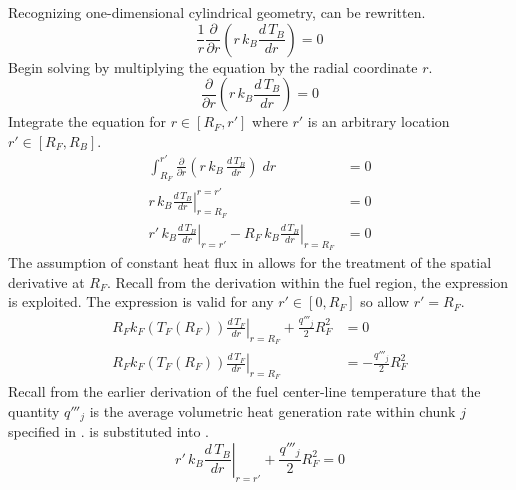       Recognizing one-dimensional cylindrical geometry,  can 
      be rewritten.
      \begin{equation}
        \label{eq:tb_heat_conduction}
        \frac{1}{r} \frac{\partial}{\partial r} \left(
          r \, k_B \frac{d \, T_B}{dr} \right) = 0
      \end{equation}
      Begin solving  by multiplying the equation by
      the radial coordinate $r$.
      \begin{equation}
        \frac{\partial}{\partial r} \left( r \, k_B \frac{d \, T_B}{dr}
          \right) = 0
      \end{equation}
      Integrate the equation for $r \in[R_F,r']$ where $r'$ is an arbitrary
      location $r' \in [R_F,R_B]$.
      \begin{align}
        \int_{R_F}^{r'} \frac{\partial}{\partial r} \left( r\, k_B \, 
          \frac{d\,T_B}{dr} \right) \; dr &= 0\\
        \left. r\, k_B \frac{d\,T_B}{dr} \right|_{r=R_F}^{r=r'} &= 0 \\
        \label{eq:tf_first_integral}
        \left. r' \, k_B \frac{d\,T_B}{dr} \right|_{r=r'} - 
          \left. R_F \, k_B \frac{d\,T_B}{dr} \right|_{r=R_F} &= 0
      \end{align}
      The assumption of constant heat flux in  
      allows for the treatment of the spatial derivative at $R_F$. Recall from
      the derivation within the fuel region, the expression 
      is exploited. The expression is valid for any $r' \in [0,R_F]$ so allow
      $r'=R_F$.
      \begin{align}
        \left. R_F k_F(T_F(R_F)) \frac{d\,T_F}{dr} \right|_{r=R_F} + 
          \frac{q'''_j}{2} R_F^2 &= 0 \\
        \label{eq:surface_relation}
        \left. R_F k_F(T_F(R_F)) \frac{d\,T_F}{dr} \right|_{r=R_F} &= 
          - \frac{q'''_j}{2} R_F^2
      \end{align}
      Recall from the earlier derivation of the fuel center-line temperature 
      that the quantity $q'''_j$ is the average volumetric heat generation rate
      within chunk $j$ specified in .
       is substituted into
      .
      \begin{equation}
        \label{eq:tf_first_bc}
        \left. r' \, k_B \frac{d\,T_B}{dr} \right|_{r=r'} +
          \frac{q'''_j}{2} R_F^2 = 0
      \end{equation}
